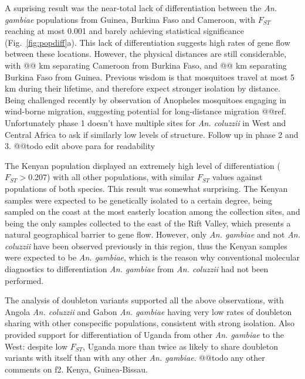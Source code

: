 \documentclass[a4paper,11pt,abstracton,hidelinks]{scrartcl}
\begin{document}
A suprising result was the near-total lack of differentiation between the \textit{An. gambiae} populations from Guinea, Burkina Faso and Cameroon, with $F_{ST}$ reaching at most 0.001 and barely achieving statistical significance (Fig.~\ref{fig:popdiff}a).
%
This lack of differentiation suggests high rates of gene flow between these locations.
%
However, the physical distances are still considerable, with @@ km separating Cameroon from Burkina Faso, and @@ km separating Burkina Faso from Guinea.
%
Previous wisdom is that mosquitoes travel at most 5 km during their lifetime, and therefore expect stronger isolation by distance.
%
Being challenged recently by observation of Anopheles mosquitoes engaging in wind-borne migration, suggesting potential for long-distance migration @@ref.
%
Unfortunately phase 1 doesn't have multiple sites for \textit{An. coluzzii} in West and Central Africa to ask if similarly low levels of structure.
%
Follow up in phase 2 and 3.
%
@@todo edit above para for readability


%
The Kenyan population displayed an extremely high level of differentiation ($F_{ST} > 0.207$) with all other populations, with similar $F_{ST}$ values against populations of both species.
%
This result was somewhat surprising.
%
The Kenyan samples were expected to be genetically isolated to a certain degree, being sampled on the coast at the most easterly location among the collection sites, and being the only samples collected to the east of the Rift Valley, which presents a natural geographical barrier to gene flow.
%
However, only \textit{An. gambiae} and not \textit{An. coluzzii} have been observed previously in this region, thus the Kenyan samples were expected to be \textit{An. gambiae}, which is the reason why conventional molecular diagnostics to differentiation \textit{An. gambiae} from \textit{An. coluzzii} had not been performed.


The analysis of doubleton variants supported all the above observations, with Angola \textit{An. coluzzii} and Gabon \textit{An. gambiae} having very low rates of doubleton sharing with other conspecific populations, consistent with strong isolation.
%
Also provided support for differentiation of Uganda from other \textit{An. gambiae} to the West: despite low $F_{ST}$, Uganda more than twice as likely to share doubleton variants with itself than with any other \textit{An. gambiae}.
%
@@todo any other comments on f2. Kenya, Guinea-Bissau.


\end{document}

